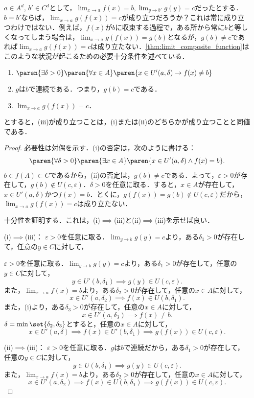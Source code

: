 \documentclass[a4paper,10pt]{ltjsarticle}
\begin{document}
\(a \in A^d\), \(b' \in C^d\)として，\(\lim_{x \to a} f(x) = b, \lim_{y \to b'} g(y) = c\)だったとする．\(b = b'\)ならば，\(\lim_{x \to a} g(f(x)) = c\)が成り立つだろうか？これは常に成り立つわけではない．例えば，\(f(x)\)が\(b\)に収束する過程で，ある所から常に\(b\)と等しくなってしまう場合は，\(\lim_{x \to a} g(f(x)) = g(b)\)となるが，\(g(b) \ne c\)であれば\(\lim_{x \to a} g(f(x)) = c\)は成り立たない．\cref{thm:limit_composite_function}はこのような状況が起こるための必要十分条件を述べている．

\begin{MyTheorem}
  \begin{enumerate}
    \item \( \paren{\exists \delta > 0}\paren{\forall x \in A}\paren{x \in U'(a, \delta) \to f(x) \ne b} \)
    \item \(g\)は\(b\)で連続である．つまり，\(g(b)=c\)である．
    \item \(\lim_{x \to a} g(f(x)) = c\)．
  \end{enumerate}
  とすると，(iii)が成り立つことは，(i)または(ii)のどちらかが成り立つことと同値である．
\end{MyTheorem}
\begin{proof}
  必要性は対偶を示す．(i)の否定は，次のように書ける：
  \[ \paren{\forall \delta > 0}\paren{\exists x \in A}\paren{x \in U'(a, \delta) \land f(x) = b}. \]
  \(b \in f(A) \subset C\)であるから，(ii)の否定は，\(g(b) \ne c\)である．よって，\(\varepsilon > 0\)が存在して，\(g(b) \notin U(c, \varepsilon)\)．\(\delta > 0\)を任意に取る．すると，\(x \in A\)が存在して，\(x \in U'(a, \delta)\)かつ\(f(x) = b\)．とくに，\(g(f(x)) = g(b) \notin U(c, \varepsilon)\)だから，\(\lim_{x \to a} g(f(x)) = c\)は成り立たない．

  十分性を証明する．これは，(i)\(\implies\)(iii)と(ii)\(\implies\)(iii)を示せば良い．

  (i)\(\implies\)(iii)： \(\varepsilon > 0\)を任意に取る．\(\lim_{y \to b} g(y) = c\)より，ある\(\delta_1 > 0\)が存在して，任意の\(y \in C\)に対して，

  \(\varepsilon > 0\)を任意に取る．\(\lim_{y \to b} g(y) = c\)より，ある\(\delta_1 > 0\)が存在して，任意の\(y \in C\)に対して，
  \[ y \in U'(b, \delta_1) \implies g(y) \in U(c, \varepsilon). \]
  また，\(\lim_{x \to a} f(x) = b\)より，ある\(\delta_2 > 0\)が存在して，任意の\(x \in A\)に対して，
  \[ x \in U'(a, \delta_2) \implies f(x) \in U(b, \delta_1). \]
  また，(i)より，ある\(\delta_3 > 0\)が存在して，任意の\(x \in A\)に対して，
  \[ x \in U'(a, \delta_3) \implies f(x) \ne b. \]
  \(\delta = \min\set{\delta_2, \delta_3}\)とすると，任意の\(x \in A\)に対して，
  \[ x \in U'(a, \delta) \implies f(x) \in U'(b, \delta_1) \implies g(f(x)) \in U(c, \varepsilon). \]

  (ii)\(\implies\)(iii)： \(\varepsilon > 0\)を任意に取る．\(g\)は\(b\)で連続だから，ある\(\delta_1 > 0\)が存在して，任意の\(y \in C\)に対して，
  \[ y \in U(b, \delta_1) \implies g(y) \in U(c, \varepsilon). \]
  また，\(\lim_{x \to a} f(x) = b\)より，ある\(\delta_2 > 0\)が存在して，任意の\(x \in A\)に対して，
  \[ x \in U'(a, \delta_2) \implies f(x) \in U(b, \delta_1) \implies g(f(x)) \in U(c, \varepsilon). \]
\end{proof}
\end{document}
